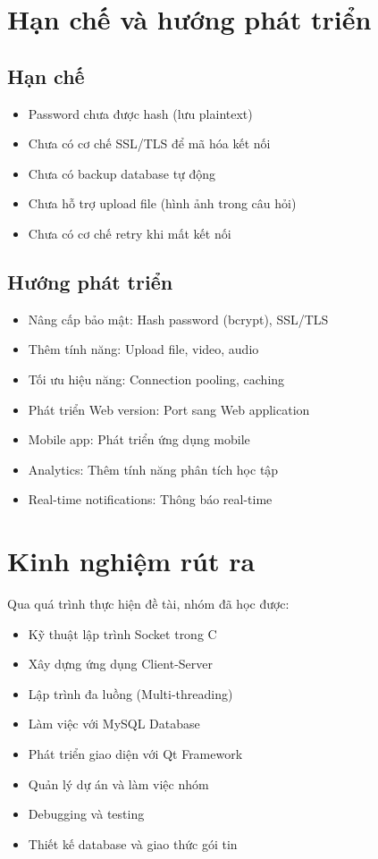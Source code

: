 \documentclass[12pt,a4paper]{report}
\begin{document}
\section{Hạn chế và hướng phát triển}

\subsection{Hạn chế}

\begin{itemize}
    \item Password chưa được hash (lưu plaintext)
    \item Chưa có cơ chế SSL/TLS để mã hóa kết nối
    \item Chưa có backup database tự động
    \item Chưa hỗ trợ upload file (hình ảnh trong câu hỏi)
    \item Chưa có cơ chế retry khi mất kết nối
\end{itemize}

\subsection{Hướng phát triển}

\begin{itemize}
    \item Nâng cấp bảo mật: Hash password (bcrypt), SSL/TLS
    \item Thêm tính năng: Upload file, video, audio
    \item Tối ưu hiệu năng: Connection pooling, caching
    \item Phát triển Web version: Port sang Web application
    \item Mobile app: Phát triển ứng dụng mobile
    \item Analytics: Thêm tính năng phân tích học tập
    \item Real-time notifications: Thông báo real-time
\end{itemize}

\section{Kinh nghiệm rút ra}

Qua quá trình thực hiện đề tài, nhóm đã học được:

\begin{itemize}
    \item Kỹ thuật lập trình Socket trong C
    \item Xây dựng ứng dụng Client-Server
    \item Lập trình đa luồng (Multi-threading)
    \item Làm việc với MySQL Database
    \item Phát triển giao diện với Qt Framework
    \item Quản lý dự án và làm việc nhóm
    \item Debugging và testing
    \item Thiết kế database và giao thức gói tin
\end{itemize}
\end{document}
